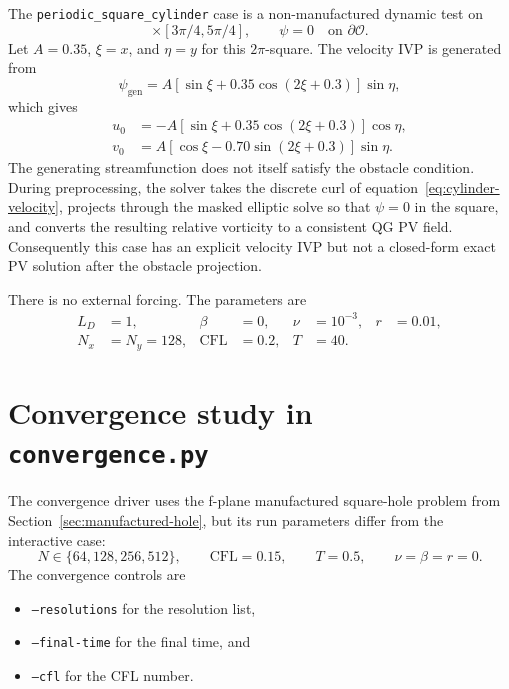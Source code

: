 \documentclass[11pt]{article}
\newcommand{\Oh}{\mathcal{O}}
\begin{document}
The \texttt{periodic\_square\_cylinder} case is a non-manufactured dynamic
test on
\begin{equation}
  [0,2\pi)\times[0,2\pi)
\end{equation}
with doubly periodic outer boundaries and a centered square obstacle of
width and height $\pi/2$.  Thus the obstacle is
\begin{equation}
  \Oh=[3\pi/4,5\pi/4]\times[3\pi/4,5\pi/4],
  \qquad \psi=0\quad\text{on }\partial\Oh.
\end{equation}
Let $A=0.35$, $\xi=x$, and $\eta=y$ for this $2\pi$-square.  The velocity
IVP is generated from
\begin{equation}
  \psi_{\mathrm{gen}}
  =A\left[\sin\xi+0.35\cos(2\xi+0.3)\right]\sin\eta,
\end{equation}
which gives
\begin{align}
  u_0
    &=-A\left[\sin\xi+0.35\cos(2\xi+0.3)\right]\cos\eta,\\
  v_0
    &=A\left[\cos\xi-0.70\sin(2\xi+0.3)\right]\sin\eta.
  \label{eq:cylinder-velocity}
\end{align}
The generating streamfunction does not itself satisfy the obstacle
condition.  During preprocessing, the solver takes the discrete curl of
equation~\eqref{eq:cylinder-velocity}, projects through the masked elliptic
solve so that $\psi=0$ in the square, and converts the resulting relative
vorticity to a consistent QG PV field.  Consequently this case has an
explicit velocity IVP but not a closed-form exact PV solution after the
obstacle projection.

There is no external forcing.  The parameters are
\begin{align}
  L_D&=1, & \beta&=0, & \nu&=10^{-3}, & r&=0.01,\\
  N_x&=N_y=128, & \mathrm{CFL}&=0.2, & T&=40.
\end{align}

\section{Convergence study in \texttt{convergence.py}}
\label{sec:convergence}

The convergence driver uses the f-plane manufactured square-hole problem
from Section~\ref{sec:manufactured-hole}, but its run parameters differ from
the interactive case:
\begin{equation}
  N\in\{64,128,256,512\},\qquad
  \mathrm{CFL}=0.15,\qquad
  T=0.5,\qquad
  \nu=\beta=r=0.
\end{equation}
The convergence controls are
\begin{itemize}
  \item \texttt{--resolutions} for the resolution list,
  \item \texttt{--final-time} for the final time, and
  \item \texttt{--cfl} for the CFL number.
\end{itemize}
\end{document}
